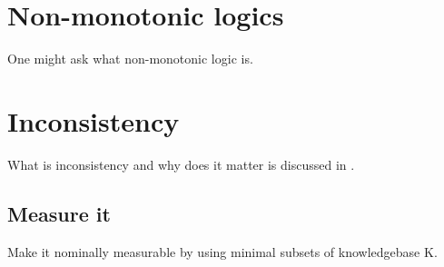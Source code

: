 \section{Non-monotonic logics}
One might ask what non-monotonic logic is.


\section{Inconsistency}
What is inconsistency and why does it matter is discussed in \cite{ulbricht_measuring_2018}.


\subsection{Measure it}
Make it nominally measurable by using minimal subsets of knowledgebase K.